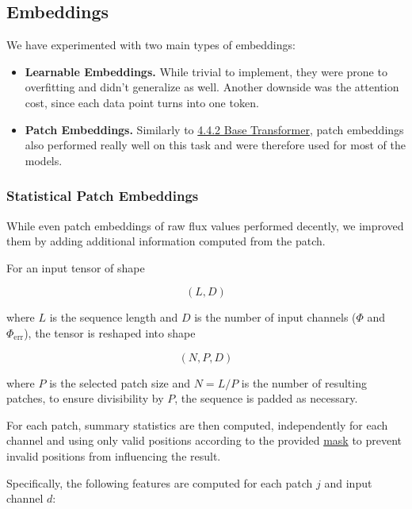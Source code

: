 \FloatBarrier

\subsection{Embeddings}

We have experimented with two main types of embeddings:

\begin{itemize}
    \item \textbf{Learnable Embeddings.} While trivial to implement, they were prone to overfitting and didn't generalize as well.
    Another downside was the attention cost, since each data point turns into one token.
    \item \textbf{Patch Embeddings.} Similarly to \hyperref[subsec:04-base-transformer]{4.4.2 Base Transformer}, patch embeddings also performed really well on this task and were therefore used for most of the models.
\end{itemize}

\subsubsection{Statistical Patch Embeddings}

While even patch embeddings of raw flux values performed decently, we improved them by adding additional information computed from the patch.

For an input tensor of shape

\[
    (L, D)
\]

where $L$ is the sequence length and $D$ is the number of input channels ($\Phi$ and $\Phi_{\mathrm{err}}$), the tensor is reshaped into shape

\[
    (N, P, D)
\]

where $P$ is the selected patch size and $N = L / P$ is the number of resulting patches, to ensure divisibility by $P$, the sequence is padded as necessary.

For each patch, summary statistics are then computed, independently for each channel and using only valid positions according to the provided \hyperref[subsec:05-observation-gaps]{mask} to prevent invalid positions from influencing the result.

Specifically, the following features are computed for each patch $j$ and input channel $d$:

